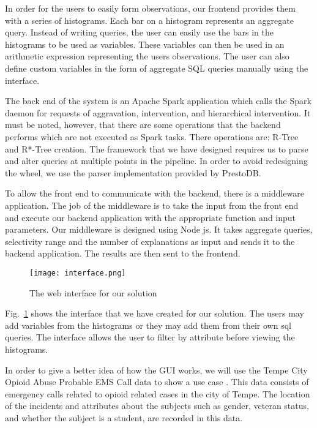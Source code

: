 In order for the users to easily form observations, our frontend provides them with a series of histograms. Each bar on a histogram represents an aggregate query. Instead of writing queries, the user can easily use the bars in the histograms to be used as variables. These variables can then be used in an arithmetic expression representing the users observations. The user can also define custom variables in the form of aggregate SQL queries manually using the interface.

The back end of the system is an Apache Spark application which calls the Spark daemon for requests of aggravation, intervention, and hierarchical intervention. It must be noted, however, that there are some operations that the backend performs which are not executed as Spark tasks. There operations are: R-Tree and R*-Tree creation. The framework that we have designed requires us to parse and alter queries at multiple points in the pipeline. In order to avoid redesigning the wheel, we use the parser implementation provided by PrestoDB\citep{prestodb}.

To allow the front end to communicate with the backend, there is a middleware application. The job of the middleware is to take the input from the front end and execute our backend application with the appropriate function and input parameters. Our middleware is designed using Node js\citep{tilkov2010node,cantelon2017node}. It takes aggregate queries, selectivity range and the number of explanations as input and sends it to the backend application. The results are then sent to the frontend.

\begin{figure}[h]
\texttt{[image: interface.png]}
\caption{The web interface for our solution}
\label{fig:interface}
\end{figure}

Fig.~\ref{fig:interface} shows the interface that we have created for our solution. The users may add variables from the histograms or they may add them from their own sql queries. The interface allows the user to filter by attribute before viewing the histograms.

In order to give a better idea of how the GUI works, we will use the Tempe City Opioid Abuse Probable EMS Call data to show a use case \citep{tempeopiod}. This data consists of emergency calls related to opioid related cases in the city of Tempe. The location of the incidents and attributes about the subjects such as gender, veteran status, and whether the subject is a student, are recorded in this data.

